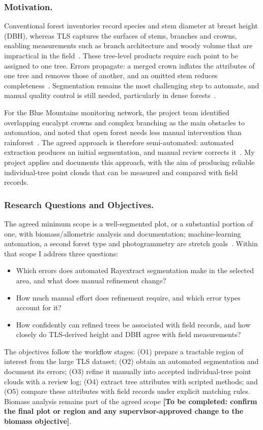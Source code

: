 \documentclass[runningheads]{llncs}
\newcommand{\todo}[1]{\textbf{[To be completed: #1]}}
\begin{document}
\subsubsection{Motivation.}
Conventional forest inventories record species and stem diameter at breast height (DBH), whereas TLS captures the surfaces of stems, branches and crowns, enabling measurements such as branch architecture and woody volume that are impractical in the field~\cite{calders2020}. These tree-level products require each point to be assigned to one tree. Errors propagate: a merged crown inflates the attributes of one tree and removes those of another, and an omitted stem reduces completeness~\cite{calders2020,cherlet2026}. Segmentation remains the most challenging step to automate, and manual quality control is still needed, particularly in dense forests~\cite{cherlet2026,cushman2026}.

For the Blue Mountains monitoring network, the project team identified overlapping eucalypt crowns and complex branching as the main obstacles to automation, and noted that open forest needs less manual intervention than rainforest~\cite{meetingnotes}. The agreed approach is therefore semi-automated: automated extraction produces an initial segmentation, and manual review corrects it~\cite{meetingnotes,pipeline}. My project applies and documents this approach, with the aim of producing reliable individual-tree point clouds that can be measured and compared with field records.

\subsubsection{Research Questions and Objectives.}
The agreed minimum scope is a well-segmented plot, or a substantial portion of one, with biomass/allometric analysis and documentation; machine-learning automation, a second forest type and photogrammetry are stretch goals~\cite{meetingnotes}. Within that scope I address three questions:
\begin{itemize}
\item[\textbf{RQ1}] Which errors does automated Rayextract segmentation make in the selected area, and what does manual refinement change?
\item[\textbf{RQ2}] How much manual effort does refinement require, and which error types account for it?
\item[\textbf{RQ3}] How confidently can refined trees be associated with field records, and how closely do TLS-derived height and DBH agree with field measurements?
\end{itemize}
The objectives follow the workflow stages: (O1) prepare a tractable region of interest from the large TLS dataset; (O2) obtain an automated segmentation and document its errors; (O3) refine it manually into accepted individual-tree point clouds with a review log; (O4) extract tree attributes with scripted methods; and (O5) compare these attributes with field records under explicit matching rules. Biomass analysis remains part of the agreed scope \todo{confirm the final plot or region and any supervisor-approved change to the biomass objective}.
\end{document}
